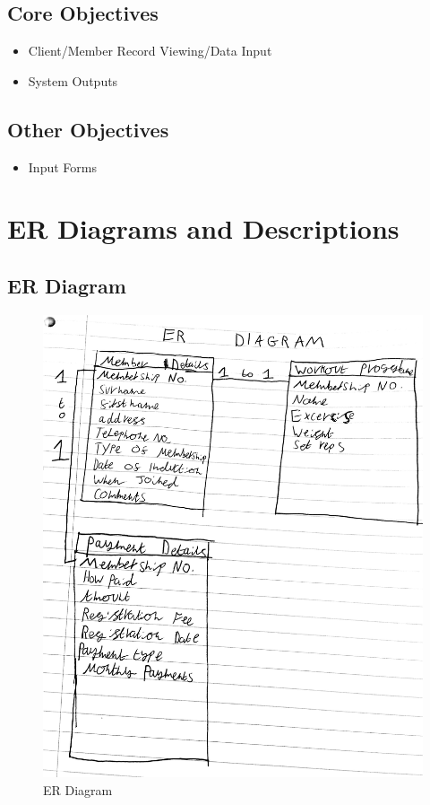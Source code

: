 \subsection{Core Objectives}

\begin{itemize}
    \item Client/Member Record Viewing/Data Input
    \item System Outputs
\end{itemize}


\subsection{Other Objectives}

\begin{itemize}
    \item Input Forms
\end{itemize}

\section{ER Diagrams and Descriptions}


\subsection{ER Diagram}

\begin{figure}[H]
    \includegraphics[width=\textwidth]{ER Diagram.jpg}
    \caption{ER Diagram} \label{fig: ER Diagram}
\end{figure}


